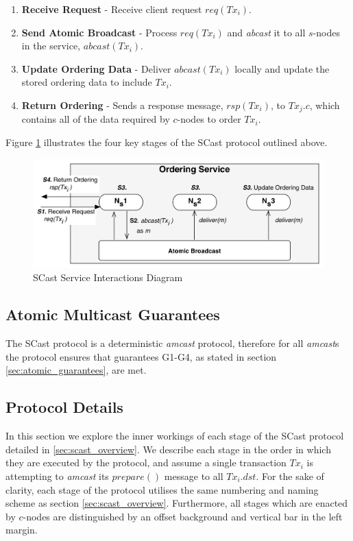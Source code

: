      \begin{enumerate}[label=\bfseries S\arabic*]
        \item    \textbf{Receive Request} - Receive client request $req(Tx_i)$.
        
        \item    \textbf{Send Atomic Broadcast} - Process $req(Tx_i)$ and \emph{abcast} it to all $s$-nodes in the service, $abcast(Tx_i)$.  
        
        \item    \textbf{Update Ordering Data} - Deliver $abcast(Tx_i)$ locally and update the stored ordering data to include $Tx_i$.  
    
        \item    \textbf{Return Ordering} - Sends a response message, $rsp(Tx_i)$, to $Tx_j.c$, which contains all of the data required by $c$-nodes to order $Tx_i$.  
    \end{enumerate}
    
    Figure \ref{fig:scast_service} illustrates the four key stages of the \textsf{SCast} protocol outlined above.  
    
    \begin{figure}[htbp!] 
        \centering    
         \includegraphics[width=1.0\textwidth]{scast_service}
         \caption[SCast Service Interactions]{SCast Service Interactions Diagram}
         \label{fig:scast_service}
    \end{figure}
    
    \subsection{Atomic Multicast Guarantees}
    The \textsf{SCast} protocol is a deterministic \emph{amcast} protocol, therefore for all \emph{amcast}s the protocol ensures that guarantees G1-G4, as stated in section \ref{sec:atomic_guarantees}, are met.      
    
    \subsection{Protocol Details} \label{ssec:scast_details}
    In this section we explore the inner workings of each stage of the \textsf{SCast} protocol detailed in \ref{sec:scast_overview}.  We describe each stage in the order in which they are executed by the protocol, and assume a single transaction $Tx_i$ is attempting to \emph{amcast} its $prepare()$ message to all $Tx_i.dst$.  For the sake of clarity, each stage of the protocol utilises the same numbering and naming scheme as section \ref{sec:scast_overview}. Furthermore, all stages which are enacted by $c$-nodes are distinguished by an offset background and vertical bar in the left margin.  
    
